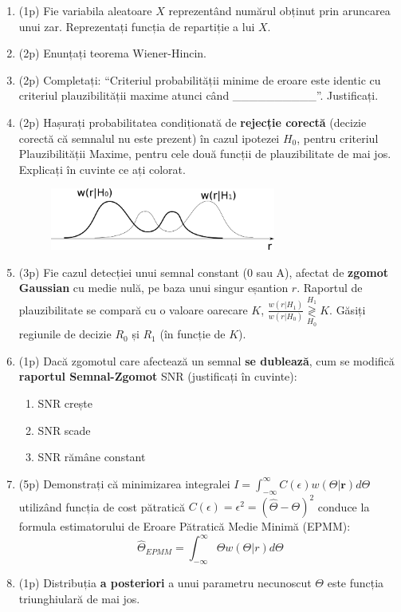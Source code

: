 \documentclass[12pt,]{scrartcl}
\providecommand{\tightlist}{%
  \setlength{\itemsep}{0pt}\setlength{\parskip}{0pt}}
\newcommand{\grtlessH}{\underset{{H_0}}{\overset{H_{1}}{\gtrless}}}
\renewcommand{\vec}[1]{\mathbf{#1}}
\begin{document}
\begin{enumerate}
\def\labelenumi{\arabic{enumi}.}
\item
  (1p) Fie variabila aleatoare \(X\) reprezentând numărul obținut prin
  aruncarea unui zar. Reprezentați funcția de repartiție a lui \(X\).
\item
  (2p) Enunțați teorema Wiener-Hincin.
\item
  (2p) Completați: ``Criteriul probabilității minime de eroare este
  identic cu criteriul plauzibilității maxime atunci când
  \_\_\_\_\_\_\_\_\_\_''. Justificați.
\item
  (2p) Hașurați probabilitatea condiționată de \textbf{rejecție corectă}
  (decizie corectă că semnalul nu este prezent) în cazul ipotezei
  \(H_0\), pentru criteriul Plauzibilității Maxime, pentru cele două
  funcții de plauzibilitate de mai jos. Explicați în cuvinte ce ați
  colorat.

  \begin{figure}[htbp]
  \centering
  \includegraphics[width=0.70000\textwidth]{fig/DET_DecisionRegions.png}
  \caption{}\label{id}
  \end{figure}
\item
  (3p) Fie cazul detecției unui semnal constant (0 sau A), afectat de
  \textbf{zgomot Gaussian} cu medie nulă, pe baza unui singur eșantion
  \(r\). Raportul de plauzibilitate se compară cu o valoare oarecare
  \(K\), \(\frac{w(r|H_1)}{w(r|H_0)} \grtlessH K\). Găsiți regiunile de
  decizie \(R_0\) și \(R_1\) (în funcție de \(K\)).
\item
  (1p) Dacă zgomotul care afectează un semnal \textbf{se dublează}, cum
  se modifică \textbf{raportul Semnal-Zgomot} SNR (justificați în
  cuvinte):

  \begin{enumerate}
  \def\labelenumii{\alph{enumii}.}
  \tightlist
  \item
    SNR crește
  \item
    SNR scade
  \item
    SNR rămâne constant
  \end{enumerate}
\item
  (5p) Demonstrați că minimizarea integralei
  \(I = \int_{-\infty}^\infty C(\epsilon) w(\Theta | \vec{r}) d\Theta\)
  utilizând funcția de cost pătratică
  \(C(\epsilon) = \epsilon^2 = (\hat{\Theta} - \Theta)^2\) conduce la
  formula estimatorului de Eroare Pătratică Medie Minimă (EPMM):
  \[\hat{\Theta}_{EPMM} = \int_{-\infty}^\infty \Theta w(\Theta|r) d\Theta\]
\item
  (1p) Distribuția \textbf{a posteriori} a unui parametru necunoscut
  \(\Theta\) este funcția triunghiulară de mai jos.


\end{enumerate}
\end{document}
